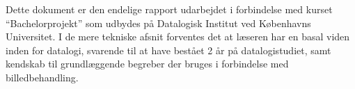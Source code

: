 {
{\sffamily Dette dokument er den endelige rapport udarbejdet i
forbindelse med kurset ``Bachelorprojekt'' som udbydes på Datalogisk
Institut ved Københavns Universitet. I de mere tekniske afsnit forventes
det at læseren har en basal viden inden for datalogi, svarende til at
have bestået 2 år på datalogistudiet, samt kendskab til grundlæggende
begreber der bruges i forbindelse med billedbehandling.

}
}


